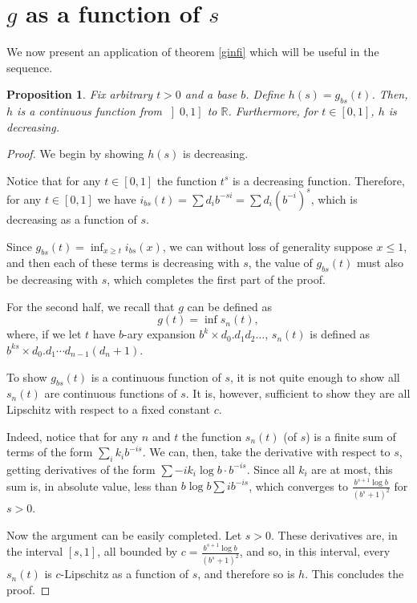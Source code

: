 \documentclass[11pt, reqno]{amsart}
\newcommand{\R}{\mathbb{R}}
\newtheorem{prop}{Proposition}
\begin{document}
\section{$g$ as a function of $s$}

We now present an application of theorem \ref{ginfi} which will be useful in the sequence.

\begin{prop} \label{gfuncofs}
Fix arbitrary $t > 0$ and a base $b$. Define $h(s) = g_{bs}(t)$. Then, $h$ is a continuous function from $\left]0, 1 \right]$ to $\R$. Furthermore, for $t \in \left[0, 1 \right]$, $h$ is decreasing.
\end{prop}

\begin{proof}
We begin by showing $h(s)$ is decreasing.

Notice that for any $t \in \left[0, 1 \right]$ the function $t^s$ is a decreasing function. Therefore, for any $t \in \left[0, 1\right]$ we have $i_{bs}(t) = \sum d_i b^{-si} = \sum d_i (b^{-i})^s$, which is decreasing as a function of $s$.

Since $g_{bs}(t) = \inf_{x \geq t} i_{bs}(x)$, we can without loss of generality suppose $x \leq 1$, and then each of these terms is decreasing with $s$, the value of $g_{bs}(t)$ must also be decreasing with $s$, which completes the first part of the proof.

For the second half, we recall that $g$ can be defined as
\[g(t) = \inf s_n(t),\]
where, if we let $t$ have $b$-ary expansion $b^k \times d_0 . d_1 d_2 \dots$, $s_n(t)$ is defined as $b^{ks} \times d_0 . d_1 \cdots d_{n-1} (d_n + 1)$.

To show $g_{bs}(t)$ is a continuous function of $s$, it is not quite enough to show all $s_n(t)$ are continuous functions of $s$. It is, however, sufficient to show they are all Lipschitz with respect to a fixed constant $c$.

Indeed, notice that for any $n$ and $t$ the function $s_n(t)$ (of $s$) is a finite sum of terms of the form $\sum_i k_i b^{-is}$.  We can, then, take the derivative with respect to $s$, getting derivatives of the form $\sum - i k_i \log b \cdot b^{-is}$. Since all $k_i$ are at most, this sum is, in absolute value, less than $b \log b \sum i b^{-is}$, which converges to $\frac{b^{s+1} \log b}{(b^s + 1)^2}$ for $s > 0$.

Now the argument can be easily completed. Let $s > 0$. These derivatives are, in the interval $\left[s, 1 \right]$, all bounded by $c = \frac{b^{s+1} \log b}{(b^s + 1)^2}$, and so, in this interval, every $s_n(t)$ is $c$-Lipschitz as a function of $s$, and therefore so is $h$. This concludes the proof.
\end{proof}
\end{document}

